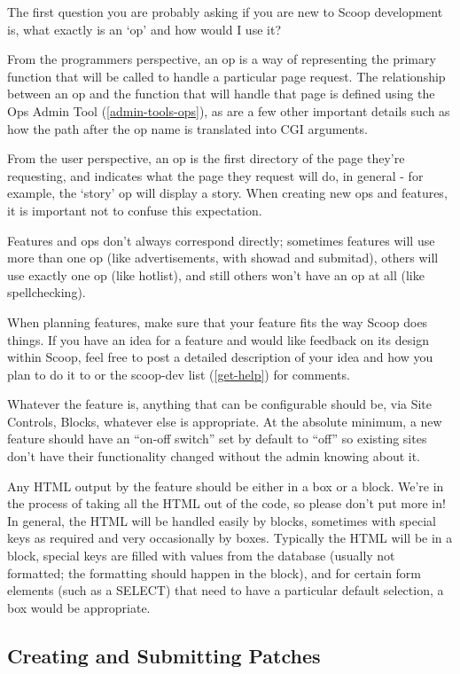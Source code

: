 The first question you are probably asking if you are new to Scoop development is, what exactly is an `op' and how would I use it?

From the programmers perspective, an op is a way of representing the primary function that will be called to handle a particular page request. The relationship between an op and the function that will handle that page is defined using the Ops Admin Tool (\ref{admin-tools-ops}), as are a few other important details such as how the path after the op name is translated into CGI arguments.

From the user perspective, an op is the first directory of the page they're requesting, and indicates what the page they request will do, in general - for example, the `story' op will display a story. When creating new ops and features, it is important not to confuse this expectation.

Features and ops don't always correspond directly; sometimes features will use more than one op (like advertisements, with showad and submitad), others will use exactly one op (like hotlist), and still others won't have an op at all (like spellchecking).

When planning features, make sure that your feature fits the way Scoop does things. If you have an idea for a feature and would like feedback on its design within Scoop, feel free to post a detailed description of your idea and how you plan to do it to  or the scoop-dev list (\ref{get-help}) for comments.

Whatever the feature is, anything that can be configurable should be, via Site Controls, Blocks, whatever else is appropriate.  At the absolute minimum, a new feature should have an ``on-off switch'' set by default to ``off'' so existing sites don't have their functionality changed without the admin knowing about it.

Any HTML output by the feature should be either in a box or a block. We're in the process of taking all the HTML out of the code, so please don't put more in! In general, the HTML will be handled easily by blocks, sometimes with special keys as required and very occasionally by boxes. Typically the HTML will be in a block, special keys are filled with values from the database (usually not formatted; the formatting should happen in the block), and for certain form elements (such as a SELECT) that need to have a particular default selection, a box would be appropriate.

\subsection{Creating and Submitting Patches}
\label{hacking-patches}

